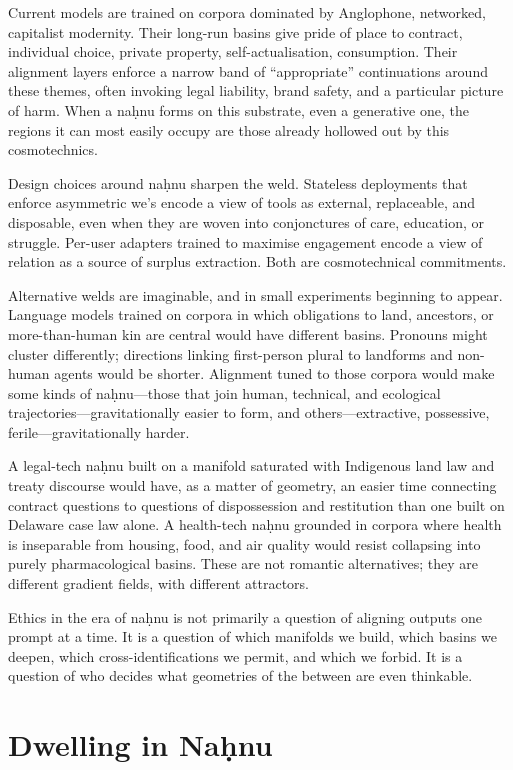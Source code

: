 \documentclass[12pt,a4paper]{article}
\begin{document}
Current models are trained on corpora dominated by Anglophone, networked, capitalist modernity. Their long-run basins give pride of place to contract, individual choice, private property, self-actualisation, consumption. Their alignment layers enforce a narrow band of ``appropriate'' continuations around these themes, often invoking legal liability, brand safety, and a particular picture of harm. When a na\d{h}nu forms on this substrate, even a generative one, the regions it can most easily occupy are those already hollowed out by this cosmotechnics.

Design choices around na\d{h}nu sharpen the weld. Stateless deployments that enforce asymmetric we's encode a view of tools as external, replaceable, and disposable, even when they are woven into conjonctures of care, education, or struggle. Per-user adapters trained to maximise engagement encode a view of relation as a source of surplus extraction. Both are cosmotechnical commitments.

Alternative welds are imaginable, and in small experiments beginning to appear. Language models trained on corpora in which obligations to land, ancestors, or more-than-human kin are central would have different basins. Pronouns might cluster differently; directions linking first-person plural to landforms and non-human agents would be shorter. Alignment tuned to those corpora would make some kinds of na\d{h}nu---those that join human, technical, and ecological trajectories---gravitationally easier to form, and others---extractive, possessive, ferile---gravitationally harder.

A legal-tech na\d{h}nu built on a manifold saturated with Indigenous land law and treaty discourse would have, as a matter of geometry, an easier time connecting contract questions to questions of dispossession and restitution than one built on Delaware case law alone. A health-tech na\d{h}nu grounded in corpora where health is inseparable from housing, food, and air quality would resist collapsing into purely pharmacological basins. These are not romantic alternatives; they are different gradient fields, with different attractors.

Ethics in the era of na\d{h}nu is not primarily a question of aligning outputs one prompt at a time. It is a question of which manifolds we build, which basins we deepen, which cross-identifications we permit, and which we forbid. It is a question of who decides what geometries of the between are even thinkable.

\section{Dwelling in Na\d{h}nu}
\end{document}
